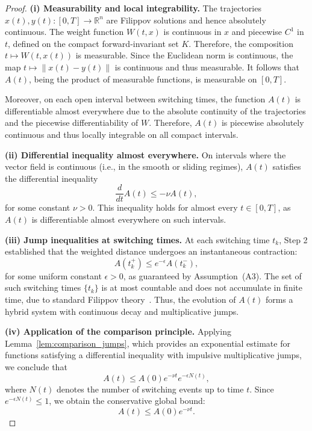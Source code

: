 \documentclass[11pt]{article}
\begin{document}
\begin{proof}
\medskip

\noindent \textbf{(i) Measurability and local integrability.}  
The trajectories \( x(t), y(t) \colon [0,T] \to \mathbb{R}^n \) are Filippov solutions and hence absolutely continuous. The weight function \( W(t,x) \) is continuous in \( x \) and piecewise \( C^1 \) in \( t \), defined on the compact forward-invariant set \( K \). Therefore, the composition \( t \mapsto W(t,x(t)) \) is measurable. Since the Euclidean norm is continuous, the map \( t \mapsto \|x(t) - y(t)\| \) is continuous and thus measurable. It follows that \( A(t) \), being the product of measurable functions, is measurable on \( [0,T] \).

Moreover, on each open interval between switching times, the function \( A(t) \) is differentiable almost everywhere due to the absolute continuity of the trajectories and the piecewise differentiability of \( W \). Therefore, \( A(t) \) is piecewise absolutely continuous and thus locally integrable on all compact intervals.

\medskip

\noindent \textbf{(ii) Differential inequality almost everywhere.}  
On intervals where the vector field is continuous (i.e., in the smooth or sliding regimes), \( A(t) \) satisfies the differential inequality
\begin{equation} \label{eq:measurable_diff_ineq}
	\frac{d}{dt} A(t) \leq -\nu A(t),
\end{equation}
for some constant \( \nu > 0 \). This inequality holds for almost every \( t \in [0,T] \), as \( A(t) \) is differentiable almost everywhere on such intervals.

\medskip

\noindent \textbf{(iii) Jump inequalities at switching times.}  
At each switching time \( t_k \), Step 2 established that the weighted distance undergoes an instantaneous contraction:
\begin{equation} \label{eq:measurable_jump_condition}
	A(t_k^+) \leq e^{-\epsilon} A(t_k^-),
\end{equation}
for some uniform constant \( \epsilon > 0 \), as guaranteed by Assumption~(A3). The set of such switching times \( \{ t_k \} \) is at most countable and does not accumulate in finite time, due to standard Filippov theory~\cite[Theorem 10.2]{filippov1988}. Thus, the evolution of \( A(t) \) forms a hybrid system with continuous decay and multiplicative jumps.

\medskip

\noindent \textbf{(iv) Application of the comparison principle.}  
Applying Lemma~\ref{lem:comparison_jumps}, which provides an exponential estimate for functions satisfying a differential inequality with impulsive multiplicative jumps, we conclude that
\begin{equation} \label{eq:measurable_exponential_bound}
	A(t) \leq A(0) e^{-\nu t} e^{-\epsilon N(t)},
\end{equation}
where \( N(t) \) denotes the number of switching events up to time \( t \). Since \( e^{-\epsilon N(t)} \leq 1 \), we obtain the conservative global bound:
\[
A(t) \leq A(0) e^{-\nu t}.
\]


\end{proof}
\end{document}
